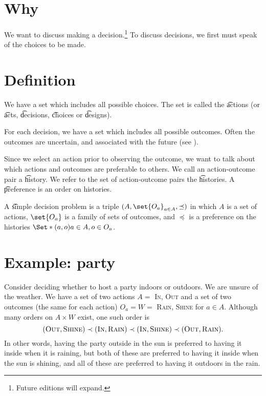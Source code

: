 

\section*{Why}

We want to discuss making a decision.\footnote{Future editions will expand.}
To discuss decisions, we first must speak of the choices to be made.

\section*{Definition}

We have a set which includes all possible choices.
The set is called the \t{actions} (or \t{acts}, \t{decisions}, \t{choices} or \t{designs}).

For each decision, we have a set which includes all possible outcomes.
Often the outcomes are uncertain, and associated with the future (see ).

Since we select an action prior to observing the outcome, we want to talk about which actions and outcomes are preferable to others.
We call an action-outcome pair a \t{history}.
We refer to the set of action-outcome pairs the \t{histories}.
A \t{preference} is an order on histories.

A \t{simple decision problem} is a triple $(A, \set{O_a}_{a \in A}, \preceq)$ in which $A$ is a set of actions, $\set{O_a}$ is a family of sets of outcomes, and $\preceq$ is a preference on the histories $\Set*{(a, o)}{a \in A, o \in O_a}$.

\section*{Example: party}

Consider deciding whether to host a party indoors or outdoors.
We are unsure of the weather.
We have a set of two actions $A = $ {\textsc{In}, \textsc{Out}} and a set of two outcomes (the same for each action) $O_a = W =$ {\textsc{Rain}, \textsc{Shine}} for $a \in A$.
Although many orders on $A \times  W$ exist, one such order is
\[
(\textsc{Out}, \textsc{Shine}) \prec (\textsc{In}, \textsc{Rain}) \prec (\textsc{In}, \textsc{Shine}) \prec (\textsc{Out}, \textsc{Rain}).
\]
In other words, having the party outside in the sun is preferred to having it inside when it is raining, but both of these are preferred to having it inside when the sun is shining, and all of these are preferred to having it outdoors in the rain.

